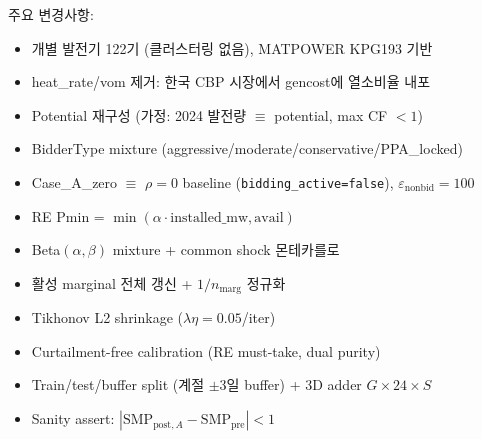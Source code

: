 \documentclass[11pt, a4paper]{article}
\begin{document}
\begin{description}[style=nextline]
    \item[v2 (개별 발전기 122기 + real-data)]
    주요 변경사항:
    \begin{itemize}[noitemsep]
        \item 개별 발전기 122기 (클러스터링 없음), MATPOWER KPG193 기반
        \item heat\_rate/vom 제거: 한국 CBP 시장에서 gencost에 열소비율 내포
        \item Potential 재구성 (가정: 2024 발전량 $\equiv$ potential, max CF $< 1$)
        \item BidderType mixture (aggressive/moderate/conservative/PPA\_locked)
        \item Case\_A\_zero $\equiv$ $\rho=0$ baseline (\texttt{bidding\_active=false}), $\varepsilon_{\text{nonbid}}=100$
        \item RE Pmin = $\min(\alpha \cdot \text{installed\_mw}, \text{avail})$
        \item Beta$(\alpha,\beta)$ mixture + common shock 몬테카를로
        \item 활성 marginal 전체 갱신 + $1/n_{\text{marg}}$ 정규화
        \item Tikhonov L2 shrinkage ($\lambda\eta = 0.05$/iter)
        \item Curtailment-free calibration (RE must-take, dual purity)
        \item Train/test/buffer split (계절 $\pm$3일 buffer) + 3D adder $G \times 24 \times S$
        \item Sanity assert: $|\text{SMP}_{\text{post},A} - \text{SMP}_{\text{pre}}| < 1$
    \end{itemize}
\end{description}
\end{document}

